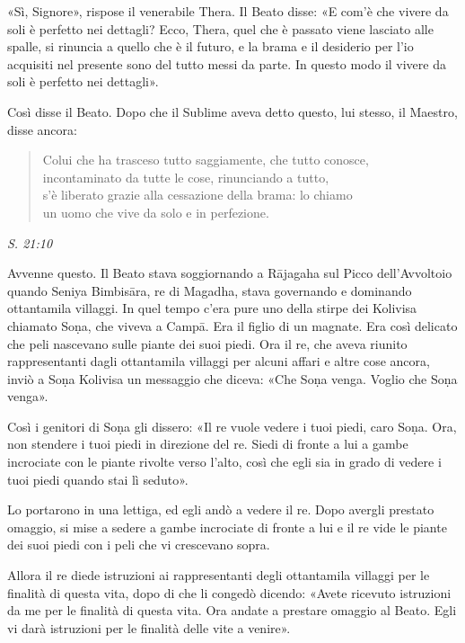 «Sì, Signore», rispose il venerabile Thera. Il Beato disse: «E com’è che
vivere da soli è perfetto nei dettagli? Ecco, Thera, quel che è passato
viene lasciato alle spalle, si rinuncia a quello che è il futuro, e la
brama e il desiderio per l’io acquisiti nel presente sono del tutto
messi da parte. In questo modo il vivere da soli è perfetto nei
dettagli».


Così disse il Beato. Dopo che il Sublime aveva detto questo, lui stesso,
il Maestro, disse ancora:


\begin{quote}
Colui che ha trasceso tutto saggiamente, che tutto conosce, \\
incontaminato da tutte le cose, rinunciando a tutto, \\
s’è liberato grazie alla cessazione della brama: lo chiamo \\
un uomo che vive da solo e in perfezione.
\end{quote}

\emph{S. 21:10}


 Avvenne questo. Il Beato stava soggiornando a Rājagaha sul
Picco dell’Avvoltoio quando Seniya Bimbisāra, re di Magadha, stava
governando e dominando ottantamila villaggi. In quel tempo c’era pure
uno della stirpe dei Kolivisa chiamato Soṇa, che viveva a Campā. Era il
figlio di un magnate. Era così delicato che peli nascevano sulle piante
dei suoi piedi. Ora il re, che aveva riunito rappresentanti dagli
ottantamila villaggi per alcuni affari e altre cose ancora, inviò a Soṇa
Kolivisa un messaggio che diceva: «Che Soṇa venga. Voglio che Soṇa
venga».


Così i genitori di Soṇa gli dissero: «Il re vuole vedere i tuoi piedi,
caro Soṇa. Ora, non stendere i tuoi piedi in direzione del re. Siedi di
fronte a lui a gambe incrociate con le piante rivolte verso l’alto, così
che egli sia in grado di vedere i tuoi piedi quando stai lì seduto».


Lo portarono in una lettiga, ed egli andò a vedere il re. Dopo avergli
prestato omaggio, si mise a sedere a gambe incrociate di fronte a lui e
il re vide le piante dei suoi piedi con i peli che vi crescevano sopra.


Allora il re diede istruzioni ai rappresentanti degli ottantamila
villaggi per le finalità di questa vita, dopo di che li congedò dicendo:
«Avete ricevuto istruzioni da me per le finalità di questa vita. Ora
andate a prestare omaggio al Beato. Egli vi darà istruzioni per le
finalità delle vite a venire».


